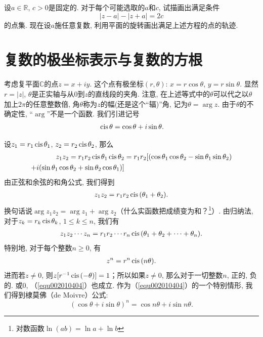 \begin{exercise}
设$a \in \mathbb{R}$, $c > 0$是固定的. 对于每个可能选取的$a$和$c$, 试描画出满足条件
\[
|z-a| - |z+a|=2c
\]
的点集. 现在设$a$施任意复数, 利用平面的旋转画出满足上述方程的点的轨迹. 
\end{exercise}

\section{复数的极坐标表示与复数的方根}\label{subsection0020104}
考虑复平面$\mathbb{C}$的点$z=x+iy$. 这个点有极坐标$(r, \theta)$: $x=r\cos{\theta}$, $y=r\sin{\theta}$. 显然$r=|z|$, $\theta$是正实轴与从0到$z$的直线段的夹角. 注意, 在上述等式中的$\theta$可以代之以$\theta$加上$2\pi$的任意整数倍, 角$\theta$称为$z$的幅(还是这个“辐)”角, 记为$\theta=\arg{z}$. 由于$\theta$的不确定性, “$\arg$”不是一个函数. 我们引进记号
\begin{gather}\label{equ002010401}
\,\text{cis}\,{\theta}=\cos{\theta}+i\sin{\theta}.
\end{gather}

设$z_1=r_1\,\text{cis}\,{\theta_1}$, $z_2=r_2\,\text{cis}\,{\theta_2}$, 那么
\[
\begin{aligned}
z_1z_2=r_1r_2\,\text{cis}\,{\theta_1}\,\text{cis}\,{\theta_2}&=r_1r_2[(\cos{\theta_1}\cos{\theta_2}-\sin{\theta_1}\sin{}\theta_2)\\
+i(\sin{\theta_1}\cos{\theta_2}+\sin{\theta_2}\cos{\theta_1})]
\end{aligned}
\]
由正弦和余弦的和角公式, 我们得到
\begin{gather}\label{equ002010402}
z_1z_2 = r_1r_2\,\text{cis}\,(\theta_1+\theta_2).
\end{gather}
换句话说$\arg{z_1z_2} = \arg{z_1} + \arg{z_2}$（什么实函数把成绩变为和？\footnote{对数函数$\ln{(ab)}=\ln{a}+\ln{b}$}）. 由归纳法, 对于$z_k=r_k\,\text{cis}\,{\theta_k}$, $1 \le k \le n$, 我们有
\begin{gather}\label{equ002010403}
z_1z_2\cdots{}z_n=r_1r_2\cdots{}r_n\,\text{cis}\,{(\theta_1+\theta_2+\cdots+\theta_n)}.
\end{gather}
特别地, 对于每个整数$n \ge 0$, 有
\begin{gather}\label{equ002010404}
z^n = r^n\,\text{cis}\,(n\theta).
\end{gather}
进而若$z \neq 0$, 则$z[r^{-1}\,\text{cis}\,(-\theta)]=1$；所以如果$z \neq 0$, 那么对于一切整数$n$, 正的, 负的. 或0, （\ref{equ002010404}）也成立. 作为（\ref{equ002010404}）的一个特别情形, 我们得到棣莫佛（de Moivre）公式: 
\[
(\cos{\theta}+i\sin{\theta})^n=\cos{n\theta} + i\sin{n\theta}.
\]

